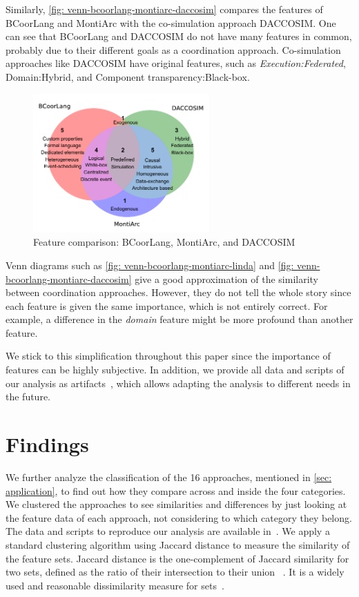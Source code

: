 \documentclass[runningheads]{llncs}
\begin{document}
Similarly, \autoref{fig: venn-bcoorlang-montiarc-daccosim} compares the features of BCoorLang and MontiArc with the co-simulation approach DACCOSIM.
One can see that BCoorLang and DACCOSIM do not have many features in common, probably due to their different goals as a coordination approach.
Co-simulation approaches like DACCOSIM have original features, such as \textit{Execution:Federated}, \textsf{Domain:Hybrid}, and \textsf{Component transparency:Black-box}.

\begin{figure}[ht]
	\centering
	\includegraphics[width=0.6\textwidth]{images/venn_bcoorlang_montiarc_daccosim}
	\caption{Feature comparison: BCoorLang, MontiArc, and DACCOSIM}
	\label{fig: venn-bcoorlang-montiarc-daccosim}
\end{figure}

Venn diagrams such as \autoref{fig: venn-bcoorlang-montiarc-linda} and \autoref{fig: venn-bcoorlang-montiarc-daccosim} give a good approximation of the similarity between coordination approaches.
However, they do not tell the whole story since each feature is given the same importance, which is not entirely correct.
For example, a difference in the \textit{domain} feature might be more profound than another feature.

We stick to this simplification throughout this paper since the importance of features can be highly subjective.
In addition, we provide all data and scripts of our analysis as artifacts~\cite{timkrauterArtifactsCoordination2024}, which allows adapting the analysis to different needs in the future.

\section{Findings} \label{sec: findings}

We further analyze the classification of the 16 approaches, mentioned in \autoref{sec: application}, to find out how they compare across and inside the four categories.
We clustered the approaches to see similarities and differences by just looking at the feature data of each approach, not considering to which category they belong.
The data and scripts to reproduce our analysis are available in~\cite{timkrauterArtifactsCoordination2024}.
We apply a standard clustering algorithm using Jaccard distance to measure the similarity of the feature sets.
Jaccard distance is the one-complement of Jaccard similarity for two sets, defined as the ratio of their intersection to their union ~\cite{levandowskyDistanceSets1971}.
It is a widely used and reasonable dissimilarity measure for sets~\cite{levandowskyDistanceSets1971}.
\end{document}
